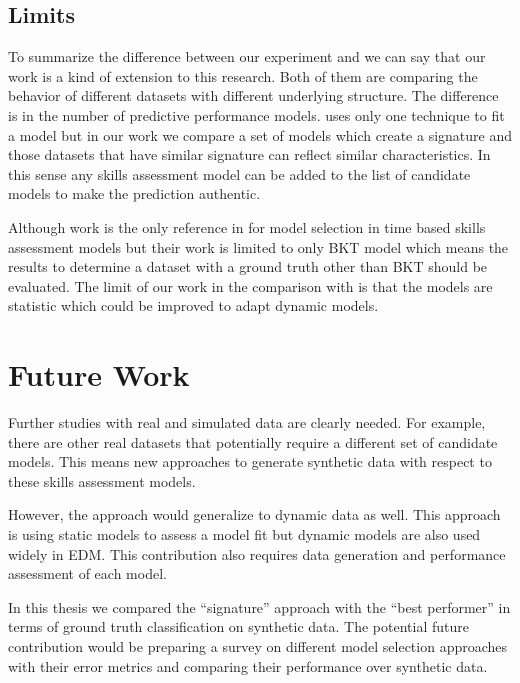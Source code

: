 \subsection{Limits}


To summarize the difference between our experiment and \cite{Desmarais2010} we can say that our work is a kind of extension to this research. Both of them are comparing the behavior of different datasets with different underlying structure. The difference is in the number of predictive performance models. \cite{Desmarais2010} uses only one technique to fit a model but in our work we compare a set of models which create a signature and those datasets that have similar signature can reflect similar characteristics. In this sense any skills assessment model can be added to the list of candidate models to make the prediction authentic.

Although \citet{Rosenberg2015} work is the only reference in for model selection in time based skills assessment models but their work is limited to only BKT model which means the results to determine a dataset with a ground truth other than BKT should be evaluated. The limit of our work in the comparison with \citet{Rosenberg2015} is that the models are statistic which could be improved to adapt dynamic models.




\section{Future Work}

Further studies with real and simulated data are clearly needed.  For example, there are other real datasets that potentially require a different set of candidate models. This means new approaches to generate synthetic data with respect to these skills assessment models.


However, the approach would generalize to dynamic data as well. This approach is using static models to assess a model fit but dynamic models are also used widely in EDM. This contribution also requires data generation and performance assessment of each model.

In this thesis we compared the ``signature'' approach with the ``best performer'' in terms of ground truth classification on synthetic data. The potential future contribution would be preparing a survey on different model selection approaches with their error metrics and comparing their performance over synthetic data.

